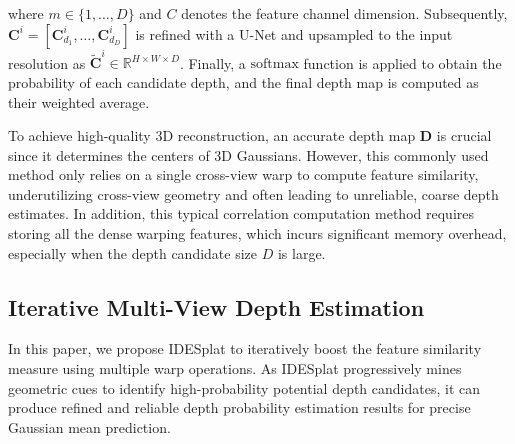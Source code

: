 %
%
where $m \in \{1,\ldots,D\}$ and $C$ denotes the feature channel dimension. 
%
%
Subsequently, $\bm{C}^{i} = [\bm{C}_{d_1}^{i}, \ldots, \bm{C}_{d_D}^{i}]$ is refined with a U-Net and upsampled to the input resolution as $\tilde{\bm{C}}^{i} \in \mathbb{R}^{H \times W \times D}$.
%
Finally, a $\mathrm{softmax}$ function is applied to obtain the probability of each candidate depth, and the final depth map is computed as their weighted average.


To achieve high-quality 3D reconstruction, an accurate depth map $\bm{D}$  is crucial since it determines the centers of 3D Gaussians.
%
%
However, this commonly used method only relies on a single cross-view warp to compute feature similarity, underutilizing cross-view geometry and often leading to unreliable, coarse depth estimates.
%
In addition, this typical correlation computation method requires storing all the dense warping features, which incurs significant memory overhead, especially when the depth candidate size $D$ is large.





\subsection{Iterative Multi-View Depth Estimation}
\label{sec:i_d_e}


In this paper, we propose IDESplat to iteratively boost the feature similarity measure using multiple warp operations.
%
As IDESplat progressively mines geometric cues to identify high-probability potential depth candidates, it can produce refined and reliable depth probability estimation results for precise Gaussian mean prediction.
%





